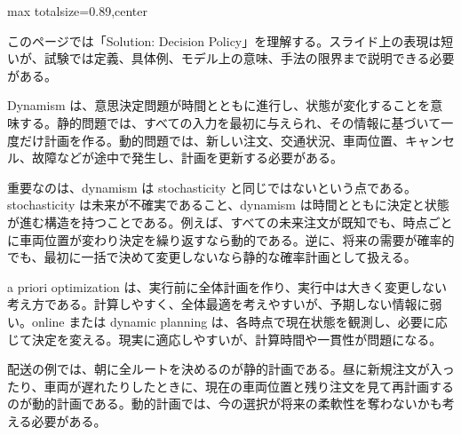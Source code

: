 \begin{minipage}[t]{0.58\textwidth}
\begin{adjustbox}{max totalsize={\textwidth}{0.89\textheight},center}
\begin{minipage}{\textwidth}\scriptsize
{}このページでは「Solution: Decision Policy」を理解する。スライド上の表現は短いが、試験では定義、具体例、モデル上の意味、手法の限界まで説明できる必要がある。\par
Dynamism は、意思決定問題が時間とともに進行し、状態が変化することを意味する。静的問題では、すべての入力を最初に与えられ、その情報に基づいて一度だけ計画を作る。動的問題では、新しい注文、交通状況、車両位置、キャンセル、故障などが途中で発生し、計画を更新する必要がある。\par
重要なのは、dynamism は stochasticity と同じではないという点である。stochasticity は未来が不確実であること、dynamism は時間とともに決定と状態が進む構造を持つことである。例えば、すべての未来注文が既知でも、時点ごとに車両位置が変わり決定を繰り返すなら動的である。逆に、将来の需要が確率的でも、最初に一括で決めて変更しないなら静的な確率計画として扱える。\par
a priori optimization は、実行前に全体計画を作り、実行中は大きく変更しない考え方である。計算しやすく、全体最適を考えやすいが、予期しない情報に弱い。online または dynamic planning は、各時点で現在状態を観測し、必要に応じて決定を変える。現実に適応しやすいが、計算時間や一貫性が問題になる。\par
配送の例では、朝に全ルートを決めるのが静的計画である。昼に新規注文が入ったり、車両が遅れたりしたときに、現在の車両位置と残り注文を見て再計画するのが動的計画である。動的計画では、今の選択が将来の柔軟性を奪わないかも考える必要がある。\par

\end{minipage}
\end{adjustbox}
\end{minipage}
